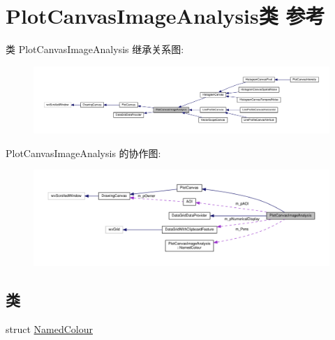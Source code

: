 \hypertarget{class_plot_canvas_image_analysis}{\section{Plot\+Canvas\+Image\+Analysis类 参考}
\label{class_plot_canvas_image_analysis}
}


类 Plot\+Canvas\+Image\+Analysis 继承关系图\+:
\nopagebreak
\begin{figure}[H]
\begin{center}
\leavevmode
\includegraphics[width=350pt]{class_plot_canvas_image_analysis__inherit__graph}
\end{center}
\end{figure}


Plot\+Canvas\+Image\+Analysis 的协作图\+:
\nopagebreak
\begin{figure}[H]
\begin{center}
\leavevmode
\includegraphics[width=350pt]{class_plot_canvas_image_analysis__coll__graph}
\end{center}
\end{figure}
\subsection*{类}
\begin{DoxyCompactItemize}
\item 
struct \hyperlink{struct_plot_canvas_image_analysis_1_1_named_colour}{Named\+Colour}
\end{DoxyCompactItemize}
